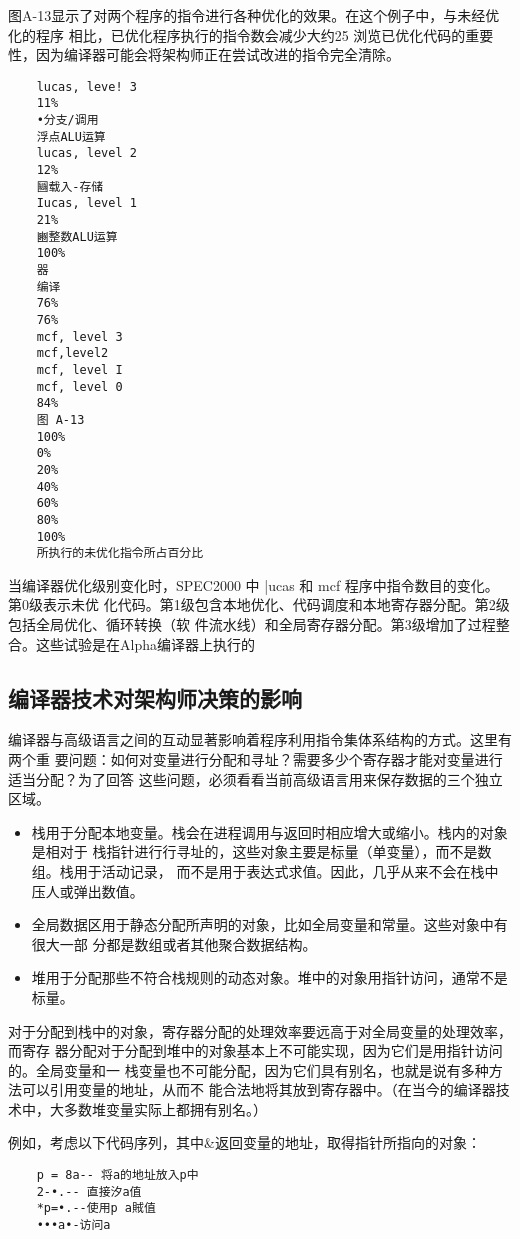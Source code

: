 图A-13显示了对两个程序的指令进行各种优化的效果。在这个例子中，与未经优化的程序
相比，已优化程序执行的指令数会减少大约25%
浏览已优化代码的重要性，因为编译器可能会将架构师正在尝试改进的指令完全清除。
\begin{verbatim}
    lucas, leve! 3
    11%
    •分支/调用
    浮点ALU运算
    lucas, level 2
    12%
    圝载入-存储
    Iucas, level 1
    21%
    豳整数ALU运算
    100%
    器
    编译
    76%
    76%
    mcf, level 3
    mcf,level2
    mcf, level I
    mcf, level 0
    84%
    图 A-13
    100%
    0%
    20%
    40%
    60%
    80%
    100%
    所执行的未优化指令所占百分比
\end{verbatim}
当编译器优化级别变化时，SPEC2000 中 |ucas 和 mcf 程序中指令数目的变化。第0级表示未优
化代码。第1级包含本地优化、代码调度和本地寄存器分配。第2级包括全局优化、循环转换（软
件流水线）和全局寄存器分配。第3级增加了过程整合。这些试验是在Alpha编译器上执行的

\subsection{编译器技术对架构师决策的影响}
编译器与高级语言之间的互动显著影响着程序利用指令集体系结构的方式。这里有两个重
要问题：如何对变量进行分配和寻址？需要多少个寄存器才能对变量进行适当分配？为了回答
这些问题，必须看看当前高级语言用来保存数据的三个独立区域。

\begin{itemize}
    \item 栈用于分配本地变量。栈会在进程调用与返回时相应增大或缩小。栈内的对象是相对于
    栈指针进行行寻址的，这些对象主要是标量（单变量），而不是数组。栈用于活动记录，
    而不是用于表达式求值。因此，几乎从来不会在栈中压人或弹出数值。
    \item 全局数据区用于静态分配所声明的对象，比如全局变量和常量。这些对象中有很大一部
    分都是数组或者其他聚合数据结构。
    \item 堆用于分配那些不符合栈规则的动态对象。堆中的对象用指针访问，通常不是标量。
\end{itemize}

对于分配到栈中的对象，寄存器分配的处理效率要远高于对全局变量的处理效率，而寄存
器分配对于分配到堆中的对象基本上不可能实现，因为它们是用指针访问的。全局变量和一
栈变量也不可能分配，因为它们具有别名，也就是说有多种方法可以引用变量的地址，从而不
能合法地将其放到寄存器中。（在当今的编译器技术中，大多数堆变量实际上都拥有别名。）

例如，考虑以下代码序列，其中\&返回变量的地址，\*取得指针所指向的对象：
\begin{verbatim}
    p = 8a-- 将a的地址放入p中
    2-•.-- 直接汐a值
    *p=•.--使用p a賊值
    •••a•-访问a
\end{verbatim}

